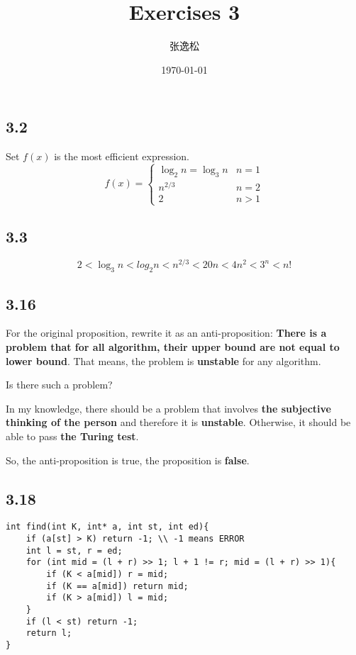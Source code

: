 \documentclass[12pt]{ctexart}
\title{Exercises 3}
\author{张逸松}
\date{\today}
\begin{document}
    \maketitle
    \subsection*{3.2}
        Set $f(x)$ is the most efficient expression.
        \[
            f(x)=
            \begin{cases}
                \log_2n = \log_3n & {n = 1} \\
                n^{2/3} & {n = 2} \\
                2 & {n > 1}
            \end{cases}
        \]
    \subsection*{3.3}
        $$2 < \log_3n < log_2n < n^{2/3} < 20n < 4n^2 < 3^n < n!$$
    \subsection*{3.16}
        For the original proposition, rewrite it as an anti-proposition: \textbf{There is a problem that for all algorithm, their upper bound are not equal to lower bound}. That means, the problem is \textbf{unstable} for any algorithm. \par
        Is there such a problem? \par
        In my knowledge, there should be a problem that involves \textbf{the subjective thinking of the person} and therefore it is \textbf{unstable}. Otherwise, it should be able to pass \textbf{the Turing test}. \par
        So, the anti-proposition is true, the proposition is \textbf{false}.
    \subsection*{3.18}
        \begin{lstlisting}
int find(int K, int* a, int st, int ed){
    if (a[st] > K) return -1; \\ -1 means ERROR
    int l = st, r = ed;
    for (int mid = (l + r) >> 1; l + 1 != r; mid = (l + r) >> 1){
        if (K < a[mid]) r = mid;
        if (K == a[mid]) return mid;
        if (K > a[mid]) l = mid;
    }
    if (l < st) return -1;
    return l;
}
        \end{lstlisting}
\end{document}
